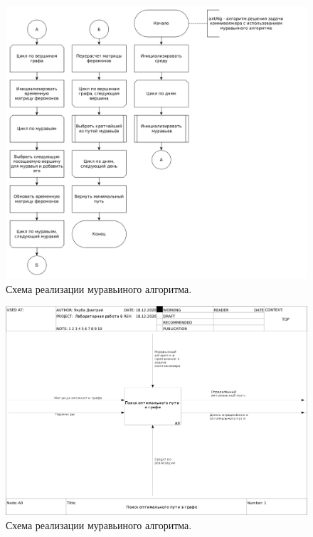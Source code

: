 \documentclass[12pt]{report}
\begin{document}
\begin{figure}[ht]
\begin{center}
\includegraphics[scale=0.4]{inc/img/antAlg.png}
\captionsetup{justification=centering}
	\caption{Схема реализации муравьиного алгоритма.}
	\label{img:antAlg}	
\end{center}
\end{figure}


\begin{figure}[ht]
\begin{center}
\includegraphics[scale=0.27]{inc/Ramus/01_A0.png}
\captionsetup{justification=centering}
	\caption{Схема реализации муравьиного алгоритма.}
	\label{img:antAlg1}	
\end{center}
\end{figure}
\end{document}
